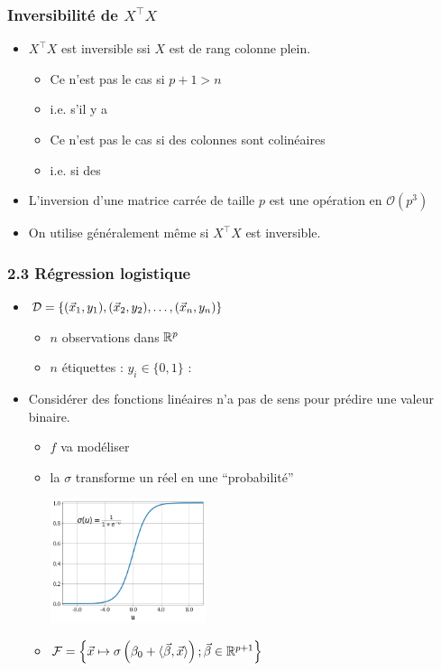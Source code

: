 \begin{frame}
  \frametitle{Inversibilité de $X^\top X$}
  \begin{itemize}
  \item $X^\top X$ est inversible ssi $X$ est de rang colonne plein.
    \pause
    \begin{itemize}
    \item Ce n'est pas le cas si $p+1 > n$ 
    \item[] i.e. s'il y a 
    \vspace{1em}
    \item Ce n'est pas le cas si des colonnes sont colinéaires
    \item[] i.e. si des 
    \end{itemize}
    \pause
  \item L'inversion d'une matrice carrée de taille $p$ est une opération en $\mathcal{O}(p^3)$
  \item[] On utilise généralement  même si $X^\top X$ est inversible. 
  \end{itemize}
\end{frame}

\begin{frame}
  \frametitle{2.3 Régression logistique}
  \begin{itemize}
  \item {} $\mathcal{D} = \{(\vec{x}_1, y_1), (\vec{x}_2, y_2), \dots, (\vec{x}_n, y_n)\}$
    \begin{itemize}
    \item $n$ observations dans ${\mathbb R}^p$ 
    \item $n$ étiquettes : $y_i \in \{0, 1\}$ : 
    \end{itemize}
  \pause
\item {} Considérer des fonctions linéaires n'a pas
  de sens pour prédire une valeur binaire.  \pause
    \begin{itemize}
    \item $f$ va modéliser 
    \pause
  \item la  $\sigma$ transforme un réel en une ``probabilité''
    \begin{center}
    \includegraphics[width=0.38\textwidth]{figures/logistic}
  \end{center}
  \item $\mathcal{F} = \left\{\vec{x} \mapsto \sigma\left(\beta_0 + \langle \vec{\beta}, \vec{x} \rangle\right) ;  \vec{\beta} \in {\mathbb R}^{p+1}\right\}$
    \end{itemize}
  \end{itemize}
\end{frame}

